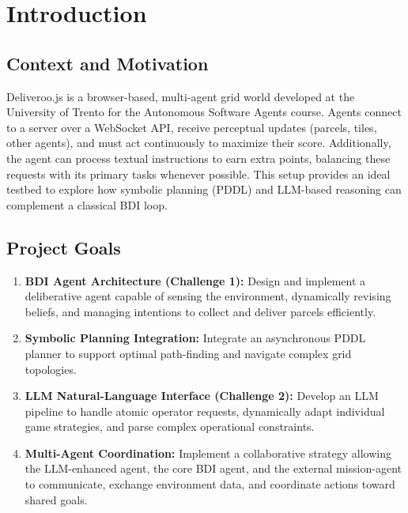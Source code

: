 \section{Introduction}

\subsection{Context and Motivation}
Deliveroo.js is a browser-based, multi-agent grid world developed at the University of Trento for the Autonomous Software Agents course. Agents connect to a server over a WebSocket API, receive perceptual updates (parcels, tiles, other agents), and must act continuously to maximize their score. Additionally, the agent can process textual instructions to earn extra points, balancing these requests with its primary tasks whenever possible. This setup provides an ideal testbed to explore how symbolic planning (PDDL) and LLM-based reasoning can complement a classical BDI loop.

\subsection{Project Goals}
\begin{enumerate}[leftmargin=*, label=\arabic*.]
  \item \textbf{BDI Agent Architecture (Challenge 1):} Design and implement a deliberative agent capable of sensing the environment, dynamically revising beliefs, and managing intentions to collect and deliver parcels efficiently.
  \item \textbf{Symbolic Planning Integration:} Integrate an asynchronous PDDL planner to support optimal path-finding and navigate complex grid topologies.
  \item \textbf{LLM Natural-Language Interface (Challenge 2):} Develop an LLM pipeline to handle atomic operator requests, dynamically adapt individual game strategies, and parse complex operational constraints.
  \item \textbf{Multi-Agent Coordination:} Implement a collaborative strategy allowing the LLM-enhanced agent, the core BDI agent, and the external mission-agent to communicate, exchange environment data, and coordinate actions toward shared goals.
\end{enumerate}